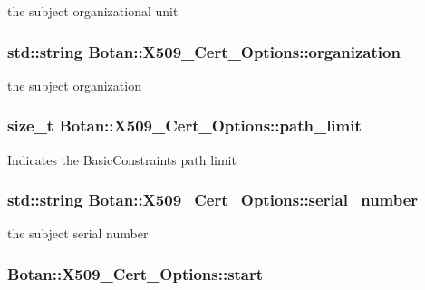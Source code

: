 the subject organizational unit \hypertarget{classBotan_1_1X509__Cert__Options_a68d79dc286874071567bc750b60c0bc3}{
\subsubsection[{organization}]{\setlength{\rightskip}{0pt plus 5cm}std\-::string Botan\-::\-X509\-\_\-\-Cert\-\_\-\-Options\-::organization}}\label{classBotan_1_1X509__Cert__Options_a68d79dc286874071567bc750b60c0bc3}
the subject organization \hypertarget{classBotan_1_1X509__Cert__Options_a82079cf287f5a5fcc911b90b6bcba1e8}{
\subsubsection[{path\-\_\-limit}]{\setlength{\rightskip}{0pt plus 5cm}size\-\_\-t Botan\-::\-X509\-\_\-\-Cert\-\_\-\-Options\-::path\-\_\-limit}}\label{classBotan_1_1X509__Cert__Options_a82079cf287f5a5fcc911b90b6bcba1e8}
Indicates the Basic\-Constraints path limit \hypertarget{classBotan_1_1X509__Cert__Options_a97e00dd64b29f47e79bb052e082d977d}{
\subsubsection[{serial\-\_\-number}]{\setlength{\rightskip}{0pt plus 5cm}std\-::string Botan\-::\-X509\-\_\-\-Cert\-\_\-\-Options\-::serial\-\_\-number}}\label{classBotan_1_1X509__Cert__Options_a97e00dd64b29f47e79bb052e082d977d}
the subject serial number \hypertarget{classBotan_1_1X509__Cert__Options_a6c733aff179893e7581a097d059fb733}{
\subsubsection[{start}]{ Botan\-::\-X509\-\_\-\-Cert\-\_\-\-Options\-::start}}\label{classBotan_1_1X509__Cert__Options_a6c733aff179893e7581a097d059fb733}
